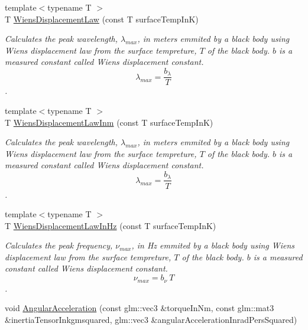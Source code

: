 \begin{DoxyCompactItemize}
{\footnotesize template$<$typename T $>$ }\\T \mbox{\hyperlink{group___e_g_x_phys-_electrodynamics-_black_body-_wiens_displacement_law_ga8f89ce1baac45a1717f604255d04af44}{Wiens\+Displacement\+Law}} (const T surface\+Temp\+InK)
\begin{DoxyCompactList}\small\item\em Calculates the peak wavelength, $\lambda_{max}$, in meters emmited by a black body using Wien\textquotesingle{}s displacement law from the surface tempreture, $T$ of the black body. $b$ is a measured constant called Wien\textquotesingle{}s displacement constant. \[\lambda_{max} = \dfrac{b_\lambda}{T} \]. \end{DoxyCompactList}\item 
{\footnotesize template$<$typename T $>$ }\\T \mbox{\hyperlink{group___e_g_x_phys-_electrodynamics-_black_body-_wiens_displacement_law_ga126ebb146c31a2371f1d1d001d11c62f}{Wiens\+Displacement\+Law\+Inm}} (const T surface\+Temp\+InK)
\begin{DoxyCompactList}\small\item\em Calculates the peak wavelength, $\lambda_{max}$, in meters emmited by a black body using Wien\textquotesingle{}s displacement law from the surface tempreture, $T$ of the black body. $b$ is a measured constant called Wien\textquotesingle{}s displacement constant. \[\lambda_{max} = \dfrac{b_\lambda}{T} \]. \end{DoxyCompactList}\item 
{\footnotesize template$<$typename T $>$ }\\T \mbox{\hyperlink{group___e_g_x_phys-_electrodynamics-_black_body-_wiens_displacement_law_gaf09ffbc9b7133c16da786c1609ecf689}{Wiens\+Displacement\+Law\+In\+Hz}} (const T surface\+Temp\+InK)
\begin{DoxyCompactList}\small\item\em Calculates the peak frequency, $\nu_{max}$, in Hz emmited by a black body using Wien\textquotesingle{}s displacement law from the surface tempreture, $T$ of the black body. $b$ is a measured constant called Wien\textquotesingle{}s displacement constant. \[\nu_{max} = b_\nu\ T \]. \end{DoxyCompactList}\item 
void \mbox{\hyperlink{group___e_g_x_phys-_kinetics-_angular_acceleration_gaf636e9a30f3db4e170829efbf40efbbe}{Angular\+Acceleration}} (const glm\+::vec3 \&torque\+In\+Nm, const glm\+::mat3 \&inertia\+Tensor\+Inkgmsquared, glm\+::vec3 \&angular\+Acceleration\+Inrad\+Pers\+Squared)

\end{DoxyCompactItemize}
